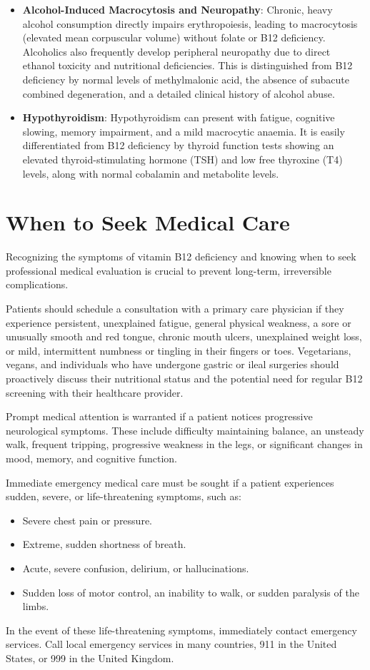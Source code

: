 \begin{itemize}
    \item \textbf{Alcohol-Induced Macrocytosis and Neuropathy}: Chronic, heavy alcohol consumption directly impairs erythropoiesis, leading to macrocytosis (elevated mean corpuscular volume) without folate or B12 deficiency. Alcoholics also frequently develop peripheral neuropathy due to direct ethanol toxicity and nutritional deficiencies. This is distinguished from B12 deficiency by normal levels of methylmalonic acid, the absence of subacute combined degeneration, and a detailed clinical history of alcohol abuse.
    \item \textbf{Hypothyroidism}: Hypothyroidism can present with fatigue, cognitive slowing, memory impairment, and a mild macrocytic anaemia. It is easily differentiated from B12 deficiency by thyroid function tests showing an elevated thyroid-stimulating hormone (TSH) and low free thyroxine (T4) levels, along with normal cobalamin and metabolite levels.
\end{itemize}

\section*{When to Seek Medical Care}
Recognizing the symptoms of vitamin B12 deficiency and knowing when to seek professional medical evaluation is crucial to prevent long-term, irreversible complications.

Patients should schedule a consultation with a primary care physician if they experience persistent, unexplained fatigue, general physical weakness, a sore or unusually smooth and red tongue, chronic mouth ulcers, unexplained weight loss, or mild, intermittent numbness or tingling in their fingers or toes. Vegetarians, vegans, and individuals who have undergone gastric or ileal surgeries should proactively discuss their nutritional status and the potential need for regular B12 screening with their healthcare provider.

Prompt medical attention is warranted if a patient notices progressive neurological symptoms. These include difficulty maintaining balance, an unsteady walk, frequent tripping, progressive weakness in the legs, or significant changes in mood, memory, and cognitive function.

Immediate emergency medical care must be sought if a patient experiences sudden, severe, or life-threatening symptoms, such as:
\begin{itemize}
    \item Severe chest pain or pressure.
    \item Extreme, sudden shortness of breath.
    \item Acute, severe confusion, delirium, or hallucinations.
    \item Sudden loss of motor control, an inability to walk, or sudden paralysis of the limbs.
\end{itemize}
In the event of these life-threatening symptoms, immediately contact emergency services. Call local emergency services in many countries, 911 in the United States, or 999 in the United Kingdom.


